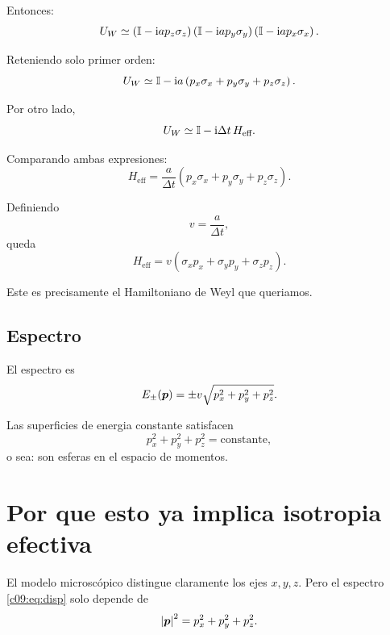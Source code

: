 Entonces:
\begin{equation}
U_W
\simeq
\left(\mathbb{I}-\mathrm{i} a p_z \sigma_z\right)
\left(\mathbb{I}-\mathrm{i} a p_y \sigma_y\right)
\left(\mathbb{I}-\mathrm{i} a p_x \sigma_x\right).
\end{equation}

Reteniendo solo primer orden:
\begin{equation}
U_W \simeq \mathbb{I} - \mathrm{i} a\left(p_x \sigma_x + p_y \sigma_y + p_z \sigma_z\right).
\label{c09:eq:UWexp}
\end{equation}

Por otro lado,
\begin{equation}
U_W \simeq \mathbb{I} - \mathrm{i} \Delta t\,H_{\text{eff}}.
\end{equation}

Comparando ambas expresiones:
\begin{equation}
H_{\text{eff}}
=
\frac{a}{\Delta t}\left(p_x \sigma_x + p_y \sigma_y + p_z \sigma_z\right).
\end{equation}

Definiendo
\begin{equation}
v=\frac{a}{\Delta t},
\end{equation}
queda
\begin{equation}
H_{\text{eff}} = v\left(\sigma_x p_x + \sigma_y p_y + \sigma_z p_z\right).
\label{c09:eq:WeylEff}
\end{equation}

Este es precisamente el Hamiltoniano de Weyl que queriamos.

\subsection{Espectro}
El espectro es
\begin{equation}
E_\pm(\bm{p})=\pm v\sqrt{p_x^2+p_y^2+p_z^2}.
\label{c09:eq:disp}
\end{equation}

Las superficies de energia constante satisfacen
\begin{equation}
p_x^2+p_y^2+p_z^2 = \text{constante},
\end{equation}
o sea: son esferas en el espacio de momentos.

\section{Por que esto ya implica isotropia efectiva}
El modelo microscópico distingue claramente los ejes \(x,y,z\). Pero el espectro \eqref{c09:eq:disp} solo depende de
\begin{equation}
\abs{\bm{p}}^2 = p_x^2+p_y^2+p_z^2.
\end{equation}

